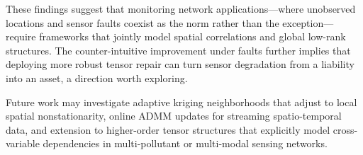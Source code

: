 \documentclass[journal]{IEEEtran}
\begin{document}
These findings suggest that monitoring network applications---where unobserved locations and sensor faults coexist as the norm rather than the exception---require frameworks that jointly model spatial correlations and global low-rank structures. The counter-intuitive improvement under faults further implies that deploying more robust tensor repair can turn sensor degradation from a liability into an asset, a direction worth exploring.

Future work may investigate adaptive kriging neighborhoods that adjust to local spatial nonstationarity, online ADMM updates for streaming spatio-temporal data, and extension to higher-order tensor structures that explicitly model cross-variable dependencies in multi-pollutant or multi-modal sensing networks.



\end{document}
